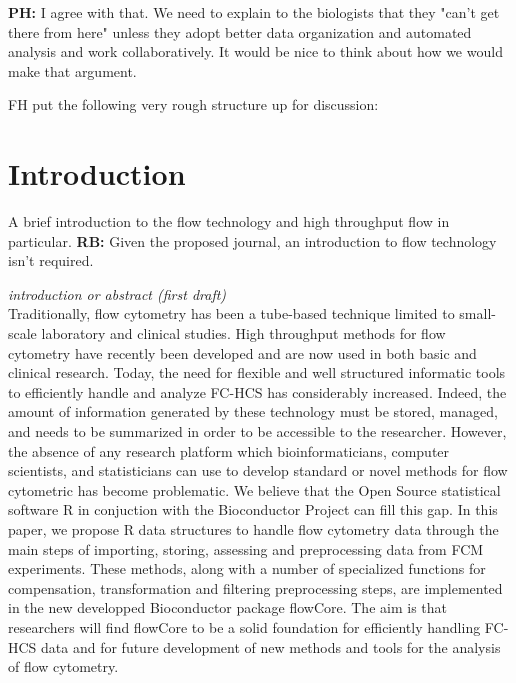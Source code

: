 \documentclass[12pt]{article}
\begin{document}
{\bf PH:} I agree with that. We need to explain to the biologists that they
"can't get there from here" unless they adopt better data organization
and automated analysis and work collaboratively. It would be nice to
think about how we would make that argument.

\bigskip
FH put the following very rough structure up for discussion:

\section{Introduction}

A brief introduction to the flow technology and high throughput flow
in particular.
{\bf RB:} Given the proposed journal, an introduction to flow technology isn't
required.

\textit{introduction or abstract (first draft)} \\ 

Traditionally, flow cytometry has been a tube-based technique limited
to small-scale laboratory and clinical studies.  High throughput
methods for flow cytometry have recently been developed and are now
used in both basic and clinical research. Today, the need for flexible
and well structured informatic tools to efficiently handle and analyze
FC-HCS has considerably increased. Indeed, the amount of information
generated by these technology must be stored, managed, and needs to be
summarized in order to be accessible to the researcher. However, the
absence of any research platform which bioinformaticians, computer
scientists, and statisticians can use to develop standard or novel
methods for flow cytometric has become problematic. We believe that
the Open Source statistical software R in conjuction with the
Bioconductor Project can fill this gap.  In this paper, we propose R
data structures to handle flow cytometry data through the main steps
of importing, storing, assessing and preprocessing data from FCM
experiments. These methods, along with a number of specialized
functions for compensation, transformation and filtering preprocessing
steps, are implemented in the new developped Bioconductor package
flowCore.  The aim is that researchers will find flowCore to be a
solid foundation for efficiently handling FC-HCS data and for future
development of new methods and tools for the analysis of flow
cytometry.
\end{document}
